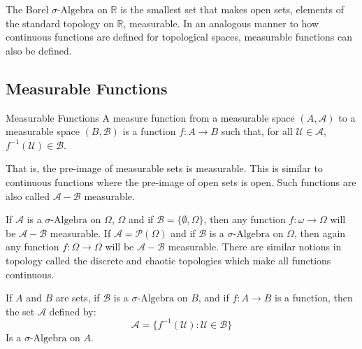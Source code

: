         The Borel $\sigma\text{-Algebra}$ on $\mathbb{R}$ is the smallest set
        that makes open sets, elements of the standard topology on $\mathbb{R}$,
        measurable. In an analogous manner to how continuous functions are
        defined for topological spaces, measurable functions can also be
        defined.
    \subsection{Measurable Functions}
        \begin{ldefinition}{Measurable Functions}
            A measure function from a measurable space $(A,\mathcal{A})$ to a
            measurable space $(B,\mathcal{B})$ is a function $f:A\rightarrow{B}$
            such that, for all $\mathcal{U}\in\mathcal{A}$,
            $f^{-1}(\mathcal{U})\in\mathcal{B}$.
        \end{ldefinition}
        That is, the pre-image of measurable sets is measurable. This is similar
        to continuous functions where the pre-image of open sets is open. Such
        functions are also called $\mathcal{A}-\mathcal{B}$ measurable.
        \begin{lexample}
            If $\mathcal{A}$ is a $\sigma\text{-Algebra}$ on $\Omega$, $\Omega$
            and if $\mathcal{B}=\{\emptyset,\Omega\}$, then any function
            $f:\omega\rightarrow\Omega$ will be $\mathcal{A}-\mathcal{B}$
            measurable. If $\mathcal{A}=\mathcal{P}(\Omega)$ and if
            $\mathcal{B}$ is a $\sigma\text{-Algebra}$ on $\Omega$, then again
            any function $f:\Omega\rightarrow\Omega$ will be
            $\mathcal{A}-\mathcal{B}$ measurable. There are similar notions in
            topology called the discrete and chaotic topologies which make all
            functions continuous.
        \end{lexample}
        \begin{theorem}
            If $A$ and $B$ are sets, if $\mathcal{B}$ is a
            $\sigma\text{-Algebra}$ on $B$, and if $f:A\rightarrow{B}$ is a
            function, then the set $\mathcal{A}$ defined by:
            \begin{equation}
                \mathcal{A}=\{f^{-1}(\mathcal{U}):\mathcal{U}\in\mathcal{B}\}
            \end{equation}
            Is a $\sigma\text{-Algebra}$ on $A$.
        \end{theorem}
